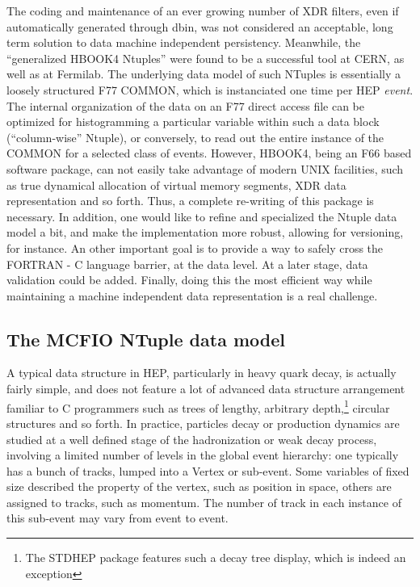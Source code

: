 The coding and maintenance of an ever growing number of XDR filters, even if
automatically generated through dbin, was not considered an acceptable, long
term solution to data machine independent persistency. Meanwhile, the
``generalized HBOOK4 Ntuples'' were found to be a successful tool at CERN, as
well as at Fermilab. The underlying data model of such NTuples is essentially a
loosely structured F77 COMMON, which is instanciated one time per HEP {\em
event}.  The internal organization of the data on an F77 direct access file can
be optimized for histogramming a particular variable within such a data block
(``column-wise'' Ntuple), or  conversely, to read out the entire instance of the
COMMON for a selected  class of events.  However, HBOOK4, being an F66 based
software package, can not easily take advantage of modern UNIX facilities, such as
true dynamical allocation of virtual memory segments, XDR data representation
and  so forth.   Thus, a complete re-writing of this  package is necessary.  In
addition, one would like to refine and specialized the Ntuple data model a bit,
and make the implementation more robust, allowing for versioning, for
instance.  An other important goal is to provide a way to safely cross  the
FORTRAN - C language barrier, at the data level.   At a later stage, data
validation could be added.  Finally, doing this the most efficient way
while maintaining a machine independent data representation is a real
challenge.       

\subsection{The MCFIO NTuple data model}

A typical data structure in HEP, particularly in heavy quark decay, is
actually fairly simple, and does not feature a lot of advanced data structure 
arrangement familiar to C programmers such as trees of lengthy, arbitrary
depth,\footnote{The STDHEP package features such a decay tree display, which
is indeed an exception} circular structures and so forth.  In practice,
particles decay or production dynamics are studied at a well defined stage of
the hadronization or weak decay process, involving a limited number of levels
in the global event hierarchy: one typically has a bunch of tracks, lumped into
a Vertex or sub-event.  Some variables  of fixed size described the property of the vertex,
such as position in space, others are assigned to tracks, such as momentum.  
The  number of track in each instance of this sub-event may vary 
from event to event. 

